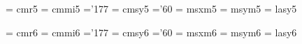 
 \font\fivrm  = cmr5               %
 \font\fivmi  = cmmi5              %
    \skewchar\fivmi ='177          %
 \font\fivsy  = cmsy5              %
    \skewchar\fivsy ='60           %
 \font\fivxm  = msxm5		   %
 \font\fivym  = msym5		   %
 \font\fivly  = lasy5             %

 \font\sixrm  = cmr6               %
 \font\sixmi  = cmmi6              %
    \skewchar\sixmi ='177          %
 \font\sixsy  = cmsy6              %
    \skewchar\sixsy ='60           %
 \font\sixxm  = msxm6		   %
 \font\sixym  = msym6		   %
 \font\sixly  = lasy6             %

